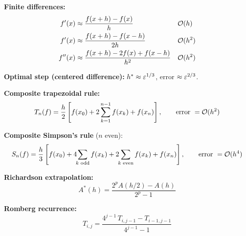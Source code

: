 \begin{keyformulas}
\textbf{Finite differences:}
\begin{align*}
    f'(x) &\approx \frac{f(x+h)-f(x)}{h} & & \mathcal{O}(h) \\
    f'(x) &\approx \frac{f(x+h)-f(x-h)}{2h} & & \mathcal{O}(h^2) \\
    f''(x) &\approx \frac{f(x+h)-2f(x)+f(x-h)}{h^2} & & \mathcal{O}(h^2)
\end{align*}

\textbf{Optimal step (centered difference):} $h^* \approx \varepsilon^{1/3}$, error $\approx \varepsilon^{2/3}$.

\textbf{Composite trapezoidal rule:}
\[
    T_n(f) = \frac{h}{2}\left[f(x_0) + 2\sum_{k=1}^{n-1}f(x_k) + f(x_n)\right], \qquad \text{error } = \mathcal{O}(h^2)
\]

\textbf{Composite Simpson's rule} ($n$ even):
\[
    S_n(f) = \frac{h}{3}\left[f(x_0) + 4\!\!\sum_{k\text{ odd}} f(x_k) + 2\!\!\sum_{k\text{ even}} f(x_k) + f(x_n)\right], \qquad \text{error } = \mathcal{O}(h^4)
\]

\textbf{Richardson extrapolation:}
\[
    A^*(h) = \frac{2^p A(h/2) - A(h)}{2^p - 1}
\]

\textbf{Romberg recurrence:}
\[
    T_{i,j} = \frac{4^{j-1}\,T_{i,j-1} - T_{i-1,j-1}}{4^{j-1}-1}
\]
\end{keyformulas}
